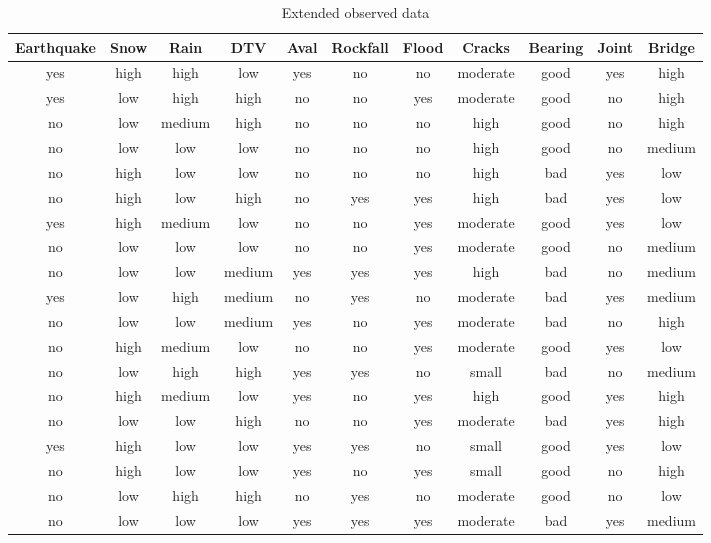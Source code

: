 \begin{table}
	\centering
	\caption{Extended observed data} \label{tblbayes4b}
\begin{tabular}{|c|c|c|c|c|c|c|c|c|c|c|}
\hline
Earthquake & Snow & Rain & DTV & Aval & Rockfall & Flood & Cracks & Bearing & Joint & Bridge \\ 
\hline
yes & high & high & low & yes & no & no & moderate & good & yes & high \\ 
\hline
yes & low & high & high & no & no & yes & moderate & good & no & high \\ 
\hline
no & low & medium & high & no & no & no & high & good & no & high \\ 
\hline
no & low & low & low & no & no & no & high & good & no & medium \\ 
\hline
no & high & low & low & no & no & no & high & bad & yes & low \\ 
\hline
no & high & low & high & no & yes & yes & high & bad & yes & low \\ 
\hline
yes & high & medium & low & no & no & yes & moderate & good & yes & low \\ 
\hline
no & low & low & low & no & no & yes & moderate & good & no & medium \\ 
\hline
no & low & low & medium & yes & yes & yes & high & bad & no & medium \\ 
\hline
yes & low & high & medium & no & yes & no & moderate & bad & yes & medium \\ 
\hline
no & low & low & medium & yes & no & yes & moderate & bad & no & high \\ 
\hline
no & high & medium & low & no & no & yes & moderate & good & yes & low \\ 
\hline
no & low & high & high & yes & yes & no & small & bad & no & medium \\ 
\hline
no & high & medium & low & yes & no & yes & high & good & yes & high \\ 
\hline
no & low & low & high & no & no & yes & moderate & bad & yes & high \\ 
\hline
yes & high & low & low & yes & yes & no & small & good & yes & low \\ 
\hline
no & high & low & low & yes & no & yes & small & good & no & high \\ 
\hline
no & low & high & high & no & yes & no & moderate & good & no & low \\ 
\hline
no & low & low & low & yes & yes & yes & moderate & bad & yes & medium \\ 

\end{tabular}
\end{table}

